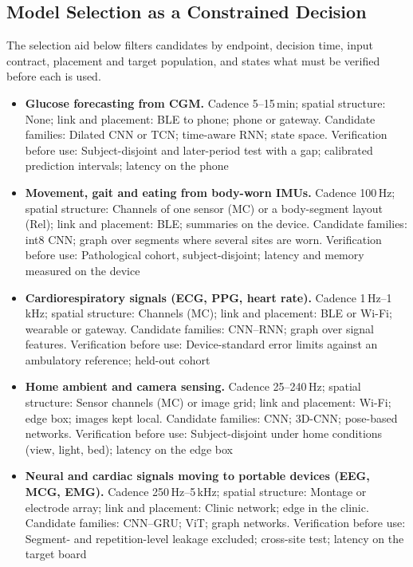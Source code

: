 \documentclass[journal]{IEEEtran}
\begin{document}
\subsection{Model Selection as a Constrained Decision}
\label{sec:constrainedselection}
The selection aid below filters candidates by endpoint, decision time, input contract, placement and target population, and states what must be verified before each is used.

\begin{itemize}
\item \textbf{Glucose forecasting from CGM.} Cadence 5--15\,min; spatial structure: None; link and placement: BLE to phone; phone or gateway. Candidate families: Dilated CNN or TCN; time-aware RNN; state space. Verification before use: Subject-disjoint and later-period test with a gap; calibrated prediction intervals; latency on the phone~\cite{Li2020GluNet,Lim2025VirtualCGM}
\item \textbf{Movement, gait and eating from body-worn IMUs.} Cadence 100\,Hz; spatial structure: Channels of one sensor (MC) or a body-segment layout (Rel); link and placement: BLE; summaries on the device. Candidate families: int8 CNN; graph over segments where several sites are worn. Verification before use: Pathological cohort, subject-disjoint; latency and memory measured on the device~\cite{Kyritsis2019EatingBehavior,verbiest2023gaitstride,herath2026parkinson}
\item \textbf{Cardiorespiratory signals (ECG, PPG, heart rate).} Cadence 1\,Hz--1\,kHz; spatial structure: Channels (MC); link and placement: BLE or Wi-Fi; wearable or gateway. Candidate families: CNN--RNN; graph over signal features. Verification before use: Device-standard error limits against an ambulatory reference; held-out cohort~\cite{liu2024cignn,wang2025vo2}
\item \textbf{Home ambient and camera sensing.} Cadence 25--240\,Hz; spatial structure: Sensor channels (MC) or image grid; link and placement: Wi-Fi; edge box; images kept local. Candidate families: CNN; 3D-CNN; pose-based networks. Verification before use: Subject-disjoint under home conditions (view, light, bed); latency on the edge box~\cite{liu2025sleepposture,chan2026sitstand,zhu2024ippg}
\item \textbf{Neural and cardiac signals moving to portable devices (EEG, MCG, EMG).} Cadence 250\,Hz--5\,kHz; spatial structure: Montage or electrode array; link and placement: Clinic network; edge in the clinic. Candidate families: CNN--GRU; ViT; graph networks. Verification before use: Segment- and repetition-level leakage excluded; cross-site test; latency on the target board~\cite{2,hussein2022seizure,li2026edgeischemia,lin2024smapen}

\end{itemize}
\end{document}
